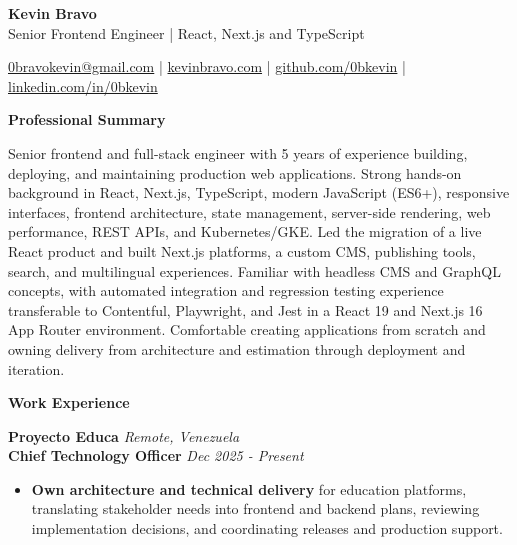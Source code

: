 \documentclass[10pt]{article}
\newcommand{\sectiontitle}[1]{%
    \vspace{4pt}
    \begin{center}
        \textbf{#1}
    \end{center}
    \vspace{-5pt}
}
\begin{document}
\raggedright

\begin{center}
    {\LARGE \textbf{Kevin Bravo}}\\
    Senior Frontend Engineer | React, Next.js and TypeScript \\
    \hrulefill
\end{center}

\begin{center}
    \href{mailto:0bravokevin@gmail.com}{0bravokevin@gmail.com}
    | \href{https://kevinbravo.com}{kevinbravo.com}
    | \href{https://github.com/0bkevin}{github.com/0bkevin}
    | \href{https://www.linkedin.com/in/0bkevin/}{linkedin.com/in/0bkevin}
\end{center}

\fontsize{10}{11.3}\selectfont

\sectiontitle{Professional Summary}
Senior frontend and full-stack engineer with 5 years of experience building, deploying, and maintaining production web applications. Strong hands-on background in React, Next.js, TypeScript, modern JavaScript (ES6+), responsive interfaces, frontend architecture, state management, server-side rendering, web performance, REST APIs, and Kubernetes/GKE. Led the migration of a live React product and built Next.js platforms, a custom CMS, publishing tools, search, and multilingual experiences. Familiar with headless CMS and GraphQL concepts, with automated integration and regression testing experience transferable to Contentful, Playwright, and Jest in a React 19 and Next.js 16 App Router environment. Comfortable creating applications from scratch and owning delivery from architecture and estimation through deployment and iteration.

\sectiontitle{Work Experience}

\textbf{Proyecto Educa} \hfill \textit{Remote, Venezuela} \\
\textbf{Chief Technology Officer} \hfill \textit{Dec 2025 - Present}
\begin{itemize}
    \item \textbf{Own architecture and technical delivery} for education platforms, translating stakeholder needs into frontend and backend plans, reviewing implementation decisions, and coordinating releases and production support.
\end{itemize}
\end{document}

